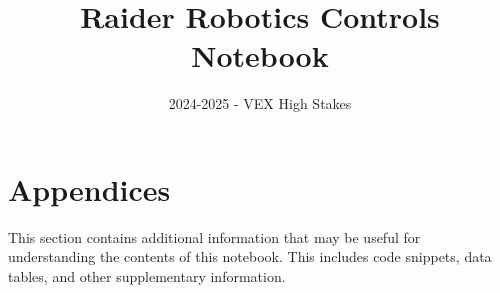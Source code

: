 \documentclass{engineeringNotebook}
\title{Raider Robotics Controls Notebook}
\subtitle{2024-2025 - VEX High Stakes}
\begin{document}
\maketitle
\graphicspath{{images/}{../images/}}
\newpage
\tableofcontents
\newpage


\newpage

\newpage


\section{Appendices}
This section contains additional information that may be useful for understanding the contents of this notebook. This includes code snippets, data tables, and other supplementary information.
\newpage

\newpage
\end{document}
